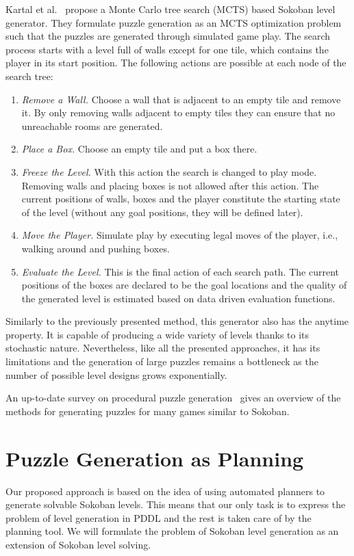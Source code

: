 \documentclass[runningheads]{llncs}
\begin{document}
Kartal et al.~\cite{kartal2016data} propose a Monte Carlo tree search (MCTS) based Sokoban level
generator. They formulate puzzle generation as an MCTS optimization problem such that the puzzles
are generated through simulated game play. The search process starts with a level full of walls except
for one tile, which contains the player in its start position. The following actions are possible at each
node of the search tree:
\begin{enumerate}
\item \emph{Remove a Wall.} Choose a wall that is adjacent to an empty tile and remove it. By only removing walls
adjacent to empty tiles they can ensure that no unreachable rooms are generated.
\item \emph{Place a Box.} Choose an empty tile and put a box there.
\item \emph{Freeze the Level.} With this action the search is changed to play mode. Removing walls and placing
boxes is not allowed after this action. The current positions of walls, boxes and the player constitute 
the starting state of the level (without any goal positions, they will be defined later).
\item \emph{Move the Player.} Simulate play by executing legal moves of the player, i.e., walking 
around and pushing boxes.
\item \emph{Evaluate the Level.} This is the final action of each search path. The current positions of the boxes
are declared to be the goal locations and the quality of the generated level is estimated based on data driven
evaluation functions.
\end{enumerate}

Similarly to the previously presented method, this generator also has the anytime property. It is capable of
producing a wide variety of levels thanks to its stochastic nature. Nevertheless, like all the presented approaches,
it has its limitations and the generation of large puzzles remains a bottleneck as the 
number of possible level designs grows exponentially.

An up-to-date survey on procedural puzzle generation~\cite{de2019procedural} gives an overview
of the methods for generating puzzles for many games similar to Sokoban.

\section{Puzzle Generation as Planning}
Our proposed approach is based on the idea of using automated planners to generate solvable Sokoban levels.
This means that our only task is to express the problem of level generation in PDDL and the rest is taken care of
by the planning tool. We will formulate the problem of Sokoban level generation as an extension of Sokoban
level solving.
\end{document}

